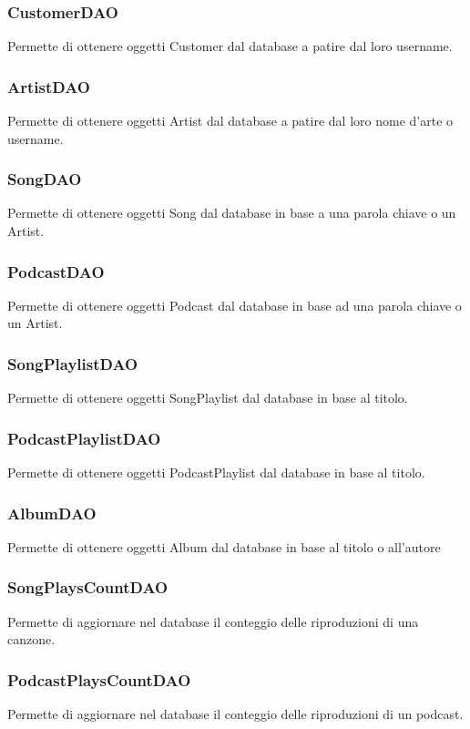\documentclass{article}
\begin{document}
  \subsubsection{CustomerDAO}
  Permette di ottenere oggetti Customer dal database a patire dal loro username.

  \subsubsection{ArtistDAO}
  Permette di ottenere oggetti Artist dal database a patire dal loro nome d'arte o username.

  \subsubsection{SongDAO}
  Permette di ottenere oggetti Song dal database in base a una parola chiave o un Artist.

  \subsubsection{PodcastDAO}
  Permette di ottenere oggetti Podcast dal database in base ad una parola chiave o un Artist.

  \subsubsection{SongPlaylistDAO}
  Permette di ottenere oggetti SongPlaylist dal database in base al titolo.

  \subsubsection{PodcastPlaylistDAO}
  Permette di ottenere oggetti PodcastPlaylist dal database in base al titolo.

  \subsubsection{AlbumDAO}
  Permette di ottenere oggetti Album dal database in base al titolo o all'autore

  \subsubsection{SongPlaysCountDAO}
  Permette di aggiornare nel database il conteggio delle riproduzioni di una canzone.

  \subsubsection{PodcastPlaysCountDAO}
  Permette di aggiornare nel database il conteggio delle riproduzioni di un podcast.
\end{document}
